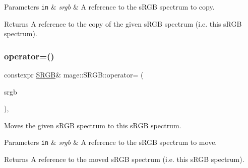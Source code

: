 \begin{DoxyParams}[1]{Parameters}
\mbox{\tt in}  & {\em srgb} & A reference to the s\+R\+GB spectrum to copy. \\
\hline
\end{DoxyParams}
\begin{DoxyReturn}{Returns}
A reference to the copy of the given s\+R\+GB spectrum (i.\+e. this s\+R\+GB spectrum). 
\end{DoxyReturn}
\hypertarget{structmage_1_1_s_r_g_b_aef2e40794d1465801e998d64d94f782d}{}\label{structmage_1_1_s_r_g_b_aef2e40794d1465801e998d64d94f782d} 
\subsubsection{\texorpdfstring{operator=()}{operator=()}\hspace{0.1cm}{\footnotesize\ttfamily [2/2]}}
{\footnotesize\ttfamily constexpr \hyperlink{structmage_1_1_s_r_g_b}{S\+R\+GB}\& mage\+::\+S\+R\+G\+B\+::operator= (\begin{DoxyParamCaption}\item[{\hyperlink{structmage_1_1_s_r_g_b}{S\+R\+GB} \&\&}]{srgb }\end{DoxyParamCaption})\hspace{0.3cm}{\ttfamily [default]}, {\ttfamily [noexcept]}}

Moves the given s\+R\+GB spectrum to this s\+R\+GB spectrum.


\begin{DoxyParams}[1]{Parameters}
\mbox{\tt in}  & {\em srgb} & A reference to the s\+R\+GB spectrum to move. \\
\hline
\end{DoxyParams}
\begin{DoxyReturn}{Returns}
A reference to the moved s\+R\+GB spectrum (i.\+e. this s\+R\+GB spectrum). 
\end{DoxyReturn}

